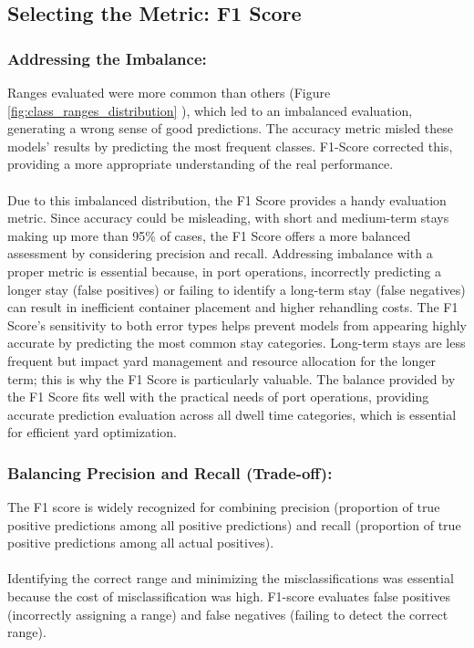 		\subsection{Selecting the Metric: F1 Score}

			\subsubsection{Addressing the Imbalance:}
				Ranges evaluated were more common than others (Figure~
				\ref{fig:class_ranges_distribution}
				), which led to an imbalanced evaluation, generating a wrong sense of good predictions. The accuracy
				metric misled these models' results by predicting the most frequent classes. F1-Score corrected this,
				providing a more appropriate understanding of the real performance.
				\\
				\\
				Due to this imbalanced distribution, the F1 Score provides a handy evaluation metric. Since accuracy
				could be misleading, with short and medium-term stays making up more than 95\%
				of cases, the F1 Score offers a more balanced assessment by considering precision and recall.
				Addressing imbalance with a proper metric is essential because, in port operations, incorrectly
				predicting a longer stay (false positives) or failing to identify a long-term stay (false
				negatives) can result in inefficient container placement and higher rehandling costs. The F1
				Score’s sensitivity to both error types helps prevent models from appearing highly accurate by
				predicting the most common stay categories. Long-term stays are less frequent but impact yard
				management and resource allocation for the longer term; this is why the F1 Score is
				particularly valuable. The balance provided by the F1 Score fits well with the practical needs of port
				operations, providing accurate prediction evaluation across all dwell time categories, which is
				essential for efficient yard optimization.

			\subsubsection{Balancing Precision and Recall (Trade-off):}
				The F1 score is widely recognized for combining precision (proportion of true positive predictions
				among all positive predictions) and recall (proportion of true positive predictions among all actual
				positives).
				\\
				\\
				Identifying the correct range and minimizing the misclassifications was essential because the cost of
				misclassification was high. F1-score evaluates false positives (incorrectly assigning a range) and
				false negatives (failing to detect the correct range).


